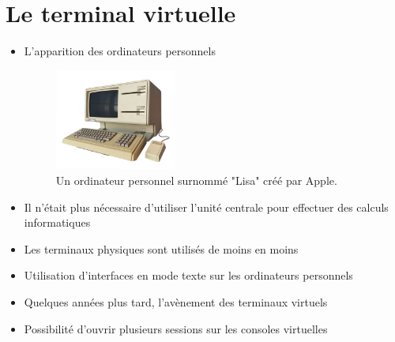 \section{Le terminal virtuelle}

\begin{frame}

	\begin{itemize}[<+->]
		\item L'apparition des ordinateurs personnels
			\begin{figure}
				\centering
				\includegraphics[width=4cm]{images/apple_lisa.jpg}
				\caption{Un ordinateur personnel surnommé "Lisa" créé par Apple.}
			\end{figure}

		\item Il n'était plus nécessaire d'utiliser l'unité centrale pour effectuer des calculs informatiques

		\item Les terminaux physiques sont utilisés de moins en moins
	\end{itemize}

\end{frame}

\begin{frame}

	\begin{itemize}[<+->]
		\item Utilisation d'interfaces en mode texte sur les ordinateurs personnels
		
		\item Quelques années plus tard, l'avènement des terminaux virtuels
		
		\item Possibilité d'ouvrir plusieurs sessions sur les consoles virtuelles
	\end{itemize}

\end{frame}

